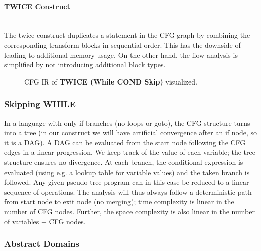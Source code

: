 \documentclass[a4paper]{article}
\newcommand{\NL}[0]{ \hfill\\\noindent }
\begin{document}
\paragraph{TWICE Construct}\NL
The twice construct duplicates a statement in the CFG graph by combining the corresponding transform blocks in sequential order. This has the downside of leading to additional memory usage. On the other hand, the flow analysis is simplified by not introducing additional block types.

\begin{figure}[ht!]
	\centering	
	\scalebox{.6}{}
	\caption{ CFG IR of \textbf{TWICE (While COND Skip)} visualized. }
	\label{twiceflow}
\end{figure}

%

\subsubsection{Skipping WHILE}
In a language with only if branches (no loops or goto), the CFG structure turns into a tree (in our construct we will have artificial convergence after an if node, so it is a DAG). A DAG can be evaluated from the start node following the CFG edges in a linear progression. We keep track of the value of each variable; the tree structure ensures no divergence. At each branch, the conditional expression is evaluated (using e.g. a lookup table for variable values) and the taken branch is followed. Any given pseudo-tree program can in this case be reduced to a linear sequence of operations. The analysis will thus always follow a deterministic path from start node to exit node (no merging); time complexity is linear in the number of CFG nodes. Further, the space complexity is also linear in the number of variables + CFG nodes.

\subsubsection{Abstract Domains}
\end{document}
